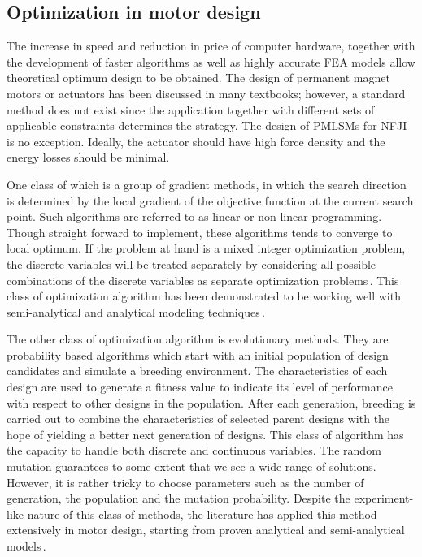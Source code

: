     \subsection{Optimization in motor design}        \label{Chapter:background/optimization methods/optimization in motor design}
    
    
        The increase in speed and reduction in price of computer hardware, together with the development of faster algorithms as well as highly accurate \acs{FEA} models allow theoretical optimum design to be obtained. The design of permanent magnet motors or actuators has been discussed in many textbooks; however, a standard method does not exist since the application together with different sets of applicable constraints determines the strategy. The design of \acsp{PMLSM} for \acs{NFJI} is no exception. Ideally, the actuator should have high force density and the energy losses should be minimal. 
    
        
        One class of which is a group of gradient methods, in which the search direction is determined by the local gradient of the objective function at the current search point. Such algorithms are referred to as linear or non-linear programming. Though straight forward to implement, these algorithms tends to converge to local optimum. If the problem at hand is a mixed integer optimization problem, the discrete variables will be treated separately by considering all possible combinations of the discrete variables as separate optimization problems\,\cite{Ruddy2015a}. This class of optimization algorithm has been demonstrated to be working well with semi-analytical and analytical modeling techniques\,\cite{Overboom2010DesignZ-module,Aleksandrov2018DesignTracks,Fang2008}. 
        
        
        The other class of optimization algorithm is evolutionary methods. They are probability based algorithms which start with an initial population of design candidates and simulate a breeding environment. The characteristics of each design are used to generate a fitness value to indicate its level of performance with respect to other designs in the population. After each generation, breeding is carried out to combine the characteristics of selected parent designs with the hope of yielding a better next generation of designs. This class of algorithm has the capacity to handle both discrete and continuous variables. The random mutation guarantees to some extent that we see a wide range of solutions. However, it is rather tricky to choose parameters such as the number of generation, the population and the mutation probability. Despite the experiment-like nature of this class of methods, the literature has applied this method extensively in motor design, starting from proven analytical and semi-analytical models\,\cite{Isfahani2007,Li2014DesignAlgorithm,Mallik2017EfficiencyAlgorithm,RuiHuang2008MinimizationArray}.
        
